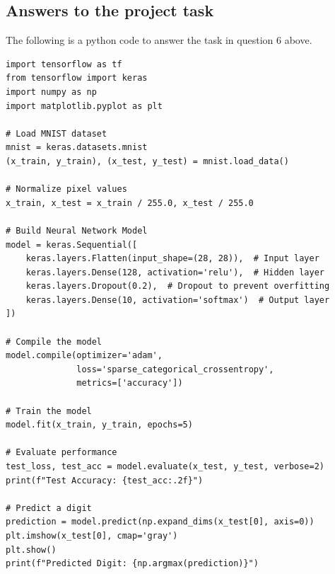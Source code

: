 \documentclass[12pt,a4paper]{article}
\begin{document}
\subsection*{Answers to the project task}
The following is a python code to answer the task in question 6 above.
\begin{verbatim}
import tensorflow as tf
from tensorflow import keras
import numpy as np
import matplotlib.pyplot as plt

# Load MNIST dataset
mnist = keras.datasets.mnist
(x_train, y_train), (x_test, y_test) = mnist.load_data()

# Normalize pixel values
x_train, x_test = x_train / 255.0, x_test / 255.0

# Build Neural Network Model
model = keras.Sequential([
    keras.layers.Flatten(input_shape=(28, 28)),  # Input layer
    keras.layers.Dense(128, activation='relu'),  # Hidden layer
    keras.layers.Dropout(0.2),  # Dropout to prevent overfitting
    keras.layers.Dense(10, activation='softmax')  # Output layer
])

# Compile the model
model.compile(optimizer='adam',
              loss='sparse_categorical_crossentropy',
              metrics=['accuracy'])

# Train the model
model.fit(x_train, y_train, epochs=5)

# Evaluate performance
test_loss, test_acc = model.evaluate(x_test, y_test, verbose=2)
print(f"Test Accuracy: {test_acc:.2f}")

# Predict a digit
prediction = model.predict(np.expand_dims(x_test[0], axis=0))
plt.imshow(x_test[0], cmap='gray')
plt.show()
print(f"Predicted Digit: {np.argmax(prediction)}")
\end{verbatim}

%

\end{document}
